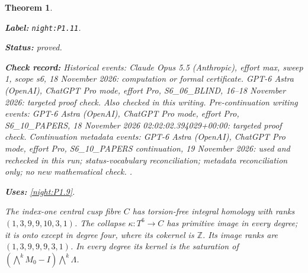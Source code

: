 \documentclass[11pt,a4paper]{article}
\newtheorem{theorem}{Theorem}[section]
\theoremstyle{definition}
\newcommand{\StatementRecord}[4]{\par\smallskip\begingroup\upshape\raggedright\noindent\textbf{Label:} \nolinkurl{#1}.\par\noindent\textbf{Status:} #2.\par\noindent\textbf{Check record:} #3.\par\noindent\textbf{Uses:} #4.\par\endgroup\smallskip}
\begin{document}
\begin{theorem}\label{night:P1.11}
\StatementRecord{night:P1.11}{proved}{Historical events: Claude Opus 5.5 (Anthropic), effort max, sweep 1, scope s6, 18 November 2026: computation or formal certificate. GPT-6 Astra (OpenAI), ChatGPT Pro mode, effort Pro, S6\_06\_BLIND, 16--18 November 2026: targeted proof check. Also checked in this writing. Pre-continuation writing events: GPT-6 Astra (OpenAI), ChatGPT Pro mode, effort Pro, S6\_10\_PAPERS, 18 November 2026 02:02:02.394029+00:00: targeted proof check. Continuation metadata events: GPT-6 Astra (OpenAI), ChatGPT Pro mode, effort Pro, S6\_10\_PAPERS continuation, 19 November 2026: used and rechecked in this run; status-vocabulary reconciliation; metadata reconciliation only; no new mathematical check. }{\cref{night:P1.9}}
The index-one central cusp fibre $C$ has torsion-free integral homology
with ranks $(1,3,9,9,10,3,1)$.
The collapse $\kappa:T^6\to C$ has primitive image in every degree;
it is onto except in degree four, where its cokernel is $\mathbb Z$.
Its image ranks are $(1,3,9,9,9,3,1)$.
In every degree its kernel is the saturation of
$(\bigwedge^kM_0-I)\bigwedge^k\Lambda$.
\end{theorem}
\end{document}
